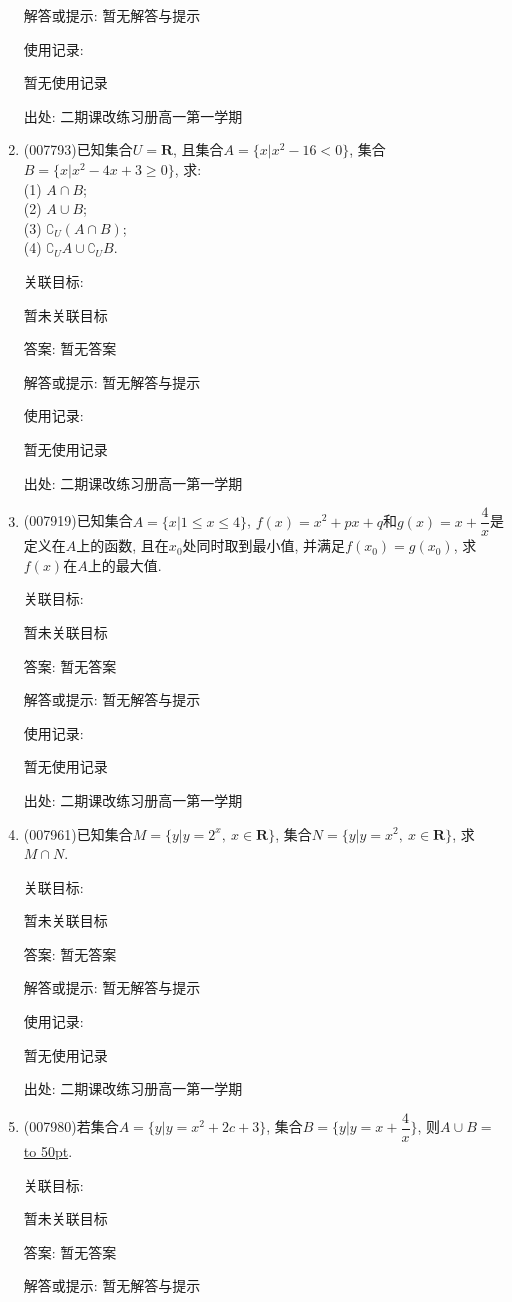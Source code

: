 \documentclass[10pt,a4paper]{article}
\newcommand{\blank}[1]{\underline{\hbox to #1pt{}}}
\begin{document}
\begin{enumerate}[1.]
解答或提示: 暂无解答与提示

使用记录:

暂无使用记录


出处: 二期课改练习册高一第一学期
\item { (007793)}已知集合$U=\mathbf{R}$, 且集合$A=\{x|x^2-16<0\}$, 集合$B=\{x|x^2-4x+3\ge 0\}$, 求:\\
(1) $A\cap B$;\\
(2) $A\cup B$;\\
(3) $\complement _U(A\cap B)$;\\
(4) $\complement _UA\cup \complement _UB$.


关联目标:

暂未关联目标

答案: 暂无答案

解答或提示: 暂无解答与提示

使用记录:

暂无使用记录


出处: 二期课改练习册高一第一学期
\item { (007919)}已知集合$A=\{x|1\le x\le 4\}$, $f(x)=x^2+px+q$和$g(x)=x+\dfrac 4x$是定义在$A$上的函数, 且在$x_0$处同时取到最小值, 并满足$f(x_0)=g(x_0)$, 求$f(x)$在$A$上的最大值.


关联目标:

暂未关联目标

答案: 暂无答案

解答或提示: 暂无解答与提示

使用记录:

暂无使用记录


出处: 二期课改练习册高一第一学期
\item { (007961)}已知集合$M=\{y|y=2^x,\ x\in \mathbf{R}\}$, 集合$N=\{y|y=x^2,\ x\in \mathbf{R}\}$, 求$M\cap N$.


关联目标:

暂未关联目标

答案: 暂无答案

解答或提示: 暂无解答与提示

使用记录:

暂无使用记录


出处: 二期课改练习册高一第一学期
\item { (007980)}若集合$A=\{y|y=x^2+2c+3\}$, 集合$B=\{y|y=x+\dfrac 4x\}$, 则$A\cup B=$\blank{50}.


关联目标:

暂未关联目标

答案: 暂无答案

解答或提示: 暂无解答与提示


\end{enumerate}
\end{document}
